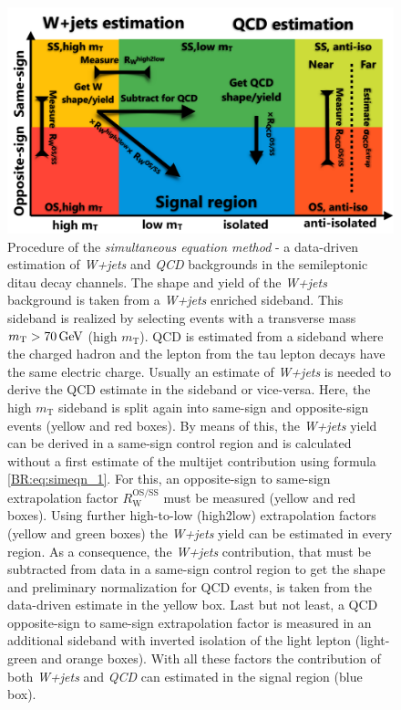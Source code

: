 \begin{figure}[h!]
    \centering
    \includegraphics[width=.8\textwidth]{Figures/background_estimation/Wjets_etmt/Simeqn_method_2-crop.pdf}
    \caption[Simultaneous equation method.]{Procedure of the \textit{simultaneous equation method} - a data-driven estimation of \textit{W+jets} and \textit{QCD} backgrounds in the semileptonic ditau decay channels. 
    The shape and yield of the \textit{W+jets} background is taken from a \textit{W+jets} enriched sideband. This sideband is realized by selecting events with a transverse mass $m_\text{T}>\text{70\,GeV}$ ($\text{high } m_\text{T}$). 
    QCD is estimated from a sideband where the charged hadron and the lepton from the tau lepton decays have the same electric charge. Usually an estimate of \textit{W+jets} is needed to derive the QCD estimate in the sideband or vice-versa.
    Here, the $\text{high } m_\text{T}$ sideband is split again into same-sign and opposite-sign events (yellow and red boxes). By means of this, the \textit{W+jets} yield can be derived  
    in a same-sign control region and is calculated without a first estimate of the multijet contribution using formula \eqref{BR:eq:simeqn_1}. 
    For this, an opposite-sign to same-sign extrapolation factor $R_\text{W}^\text{OS/SS}$ must be measured (yellow and red boxes). Using further high-to-low (high2low) extrapolation factors (yellow and green boxes) the \textit{W+jets} yield can be estimated in every region. 
    As a consequence, the \textit{W+jets} contribution, that must be subtracted from data in a same-sign control region to get the shape and preliminary normalization for QCD events, is taken from the data-driven estimate in the yellow box.
    Last but not least, a QCD opposite-sign to same-sign extrapolation factor is measured in an additional sideband with inverted isolation of the light lepton (light-green and orange boxes).
    With all these factors the contribution of both \textit{W+jets} and \textit{QCD} can estimated in the signal region (blue box).}\label{BE:W:simeqn_method_sketch}
\end{figure}%

